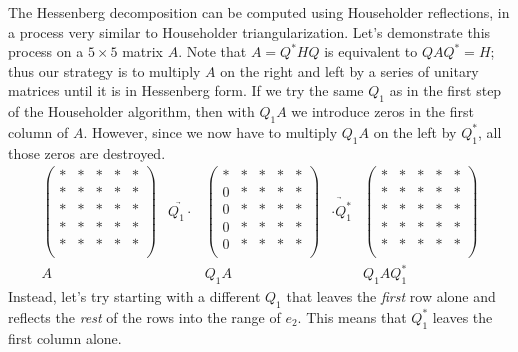 The Hessenberg decomposition can be computed using Householder reflections, in a process very similar to Householder triangularization. Let's demonstrate this process on a $5 \times 5$ matrix $A$. Note that $A=Q^*HQ$ is equivalent to $QAQ^* = H$; thus our strategy is to multiply $A$ on the right and left by a series of unitary matrices until it is in Hessenberg form. If we try the same $Q_1$ as in the first step of the Householder algorithm, then with $Q_1 A$ we introduce zeros in the first column of $A$. However, since we now have to multiply $Q_1 A$ on the left by $Q_1^*$, all those zeros are destroyed.
\[
\begin{array}{ccccc} 
\begin{pmatrix}
* & * & * & * & *\\
* & * & * & * & *\\
* & * & * & * & *\\
* & * & * & * & *\\
* & * & * & * & *\\
\end{pmatrix} 
&\underrightarrow{Q_1 \cdot }&
\begin{pmatrix}
* & * & * & * & *\\
0 & * & * & * & *\\
0 & * & * & * & *\\
0 & * & * & * & *\\
0 & * & * & * & *\\
\end{pmatrix} 
&\underrightarrow{\cdot Q_1^* }&
\begin{pmatrix}
* & * & * & * & *\\
* & * & * & * & *\\
* & * & * & * & *\\
* & * & * & * & *\\
* & * & * & * & *\\
\end{pmatrix} 
\\ 
A & & Q_1A & & Q_1 A Q_1^*
  \end{array}
\]
Instead, let's try starting with a different $Q_1$ that leaves the \emph{first} row alone and reflects the \emph{rest} of the rows into the range of $e_2$. This means that $Q_1^*$ leaves the first column alone.
